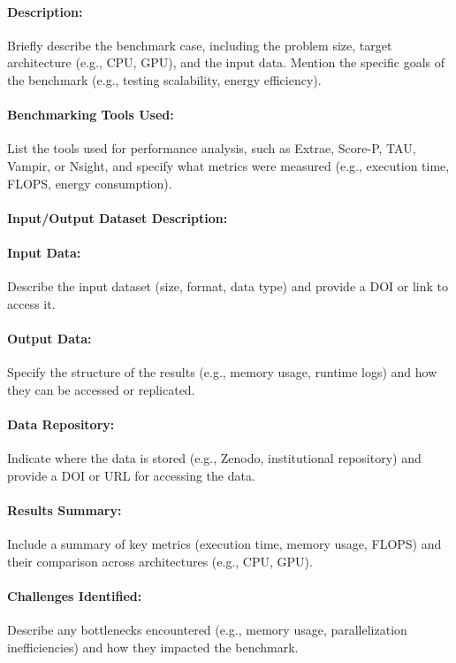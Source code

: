 \paragraph{Description:} Briefly describe the benchmark case, including the problem size, target architecture (e.g., CPU, GPU), and the input data. Mention the specific goals of the benchmark (e.g., testing scalability, energy efficiency).

\paragraph{Benchmarking Tools Used:} List the tools used for performance analysis, such as Extrae, Score-P, TAU, Vampir, or Nsight, and specify what metrics were measured (e.g., execution time, FLOPS, energy consumption).

\paragraph{Input/Output Dataset Description:}
\paragraph{Input Data:} Describe the input dataset (size, format, data type) and provide a DOI or link to access it.

\paragraph{Output Data:} Specify the structure of the results (e.g., memory usage, runtime logs) and how they can be accessed or replicated.

\paragraph{Data Repository:} Indicate where the data is stored (e.g., Zenodo, institutional repository) and provide a DOI or URL for accessing the data.

\paragraph{Results Summary:} Include a summary of key metrics (execution time, memory usage, FLOPS) and their comparison across architectures (e.g., CPU, GPU).

\paragraph{Challenges Identified:} Describe any bottlenecks encountered (e.g., memory usage, parallelization inefficiencies) and how they impacted the benchmark.

